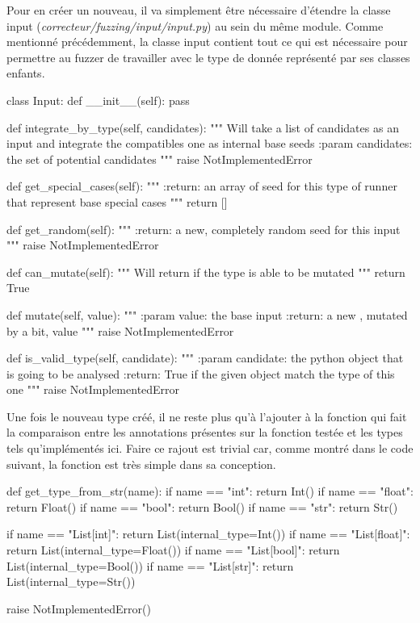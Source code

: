 \documentclass[a4paper]{report}
\begin{document}
Pour en créer un nouveau, il va simplement être nécessaire d'étendre la classe input (\textit{correcteur/fuzzing/input/input.py}) au sein du même module.
Comme mentionné précédemment, la classe input contient tout ce qui est nécessaire pour permettre au fuzzer de travailler avec le type de donnée représenté par ses classes enfants.
\begin{python}
class Input:
    def __init__(self):
        pass

    def integrate_by_type(self, candidates):
        """
        Will take a list of candidates as an input
        and integrate the compatibles one as internal
        base seeds
        :param candidates: the set of potential candidates
        """
        raise NotImplementedError

    def get_special_cases(self):
        """
        :return: an array of seed for this type of
        	runner that represent base special cases
        """
        return []

    def get_random(self):
        """
        :return: a new, completely random seed for
        	this input
        """
        raise NotImplementedError

    def can_mutate(self):
        """
        Will return if the type is able to be mutated
        """
        return True

    def mutate(self, value):
        """
        :param value: the base input
        :return: a new , mutated by a bit, value
        """
        raise NotImplementedError

    def is_valid_type(self, candidate):
        """
        :param candidate: the python object that is
        	going to be analysed
        :return: True if the given object match the
        	type of this one
        """
        raise NotImplementedError
\end{python}

Une fois le nouveau type créé, il ne reste plus qu'à l'ajouter à la fonction qui fait la comparaison entre les annotations présentes sur la fonction testée et les types tels qu'implémentés ici.
Faire ce rajout est trivial car, comme montré dans le code suivant, la fonction est très simple dans sa conception.

\begin{python}
def get_type_from_str(name):
    if name == "int":
        return Int()
    if name == "float":
        return Float()
    if name == "bool":
        return Bool()
    if name == "str":
        return Str()

    if name == "List[int]":
        return List(internal_type=Int())
    if name == "List[float]":
        return List(internal_type=Float())
    if name == "List[bool]":
        return List(internal_type=Bool())
    if name == "List[str]":
        return List(internal_type=Str())

    raise NotImplementedError()
\end{python}
\end{document}
